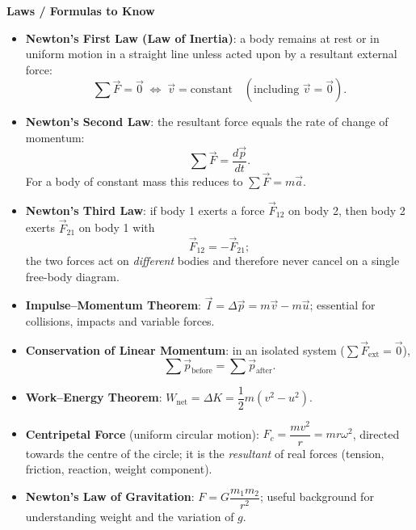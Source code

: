\documentclass[11pt]{article}
\begin{document}
\begin{bilan}
\textbf{Laws / Formulas to Know}
\begin{itemize}
\item \textbf{Newton's First Law (Law of Inertia)}: a body remains at rest or in uniform motion in a straight line unless acted upon by a resultant external force:
\[ \sum \vec F = \vec 0 \;\Longleftrightarrow\; \vec v = \text{constant} \quad (\text{including } \vec v = \vec 0). \]
\item \textbf{Newton's Second Law}: the resultant force equals the rate of change of momentum:
\[ \sum \vec F = \frac{d\vec p}{dt}. \]
For a body of constant mass this reduces to $\sum \vec F = m\vec a$.
\item \textbf{Newton's Third Law}: if body 1 exerts a force $\vec F_{12}$ on body 2, then body 2 exerts $\vec F_{21}$ on body 1 with
\[ \vec F_{12} = -\vec F_{21}; \]
the two forces act on \emph{different} bodies and therefore never cancel on a single free-body diagram.
\item \textbf{Impulse--Momentum Theorem}: $\vec I = \Delta\vec p = m\vec v - m\vec u$; essential for collisions, impacts and variable forces.
\item \textbf{Conservation of Linear Momentum}: in an isolated system ($\sum\vec F_{\text{ext}} = \vec 0$),
\[ \sum\vec p_{\text{before}} = \sum\vec p_{\text{after}}. \]
\item \textbf{Work--Energy Theorem}: $W_{\text{net}} = \Delta K = \dfrac{1}{2}m(v^{2}-u^{2})$.
\item \textbf{Centripetal Force} (uniform circular motion): $F_c = \dfrac{mv^{2}}{r} = mr\omega^{2}$, directed towards the centre of the circle; it is the \emph{resultant} of real forces (tension, friction, reaction, weight component).
\item \textbf{Newton's Law of Gravitation}: $F = G\dfrac{m_1 m_2}{r^{2}}$; useful background for understanding weight and the variation of $g$.
\end{itemize}


\end{bilan}
\end{document}
